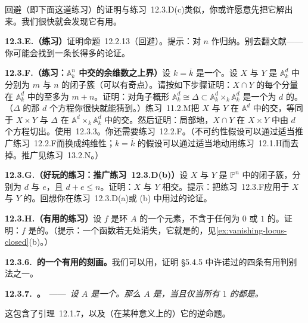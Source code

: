 \trPrimeIdeal{}回避（即下面这道练习）的证明与\mbox{练习~12.3.D(c)}类似，你或许愿意先把它解出来。我们很快就会发现它有用。

\textbf{12.3.E.（练习）}\quad 证明命题~12.2.13（\trPrimeIdeal{}回避）。提示：对 $n$ 作归纳。别去翻文献——你可能会找到一条长得多的论证。

\textbf{12.3.F.（练习：$\mathbb{A}^n_k$ 中交的余维数之上界）}\quad 设 $k=\overline{k}$ 是一个\trAlgClosedField。设 $X$ 与 $Y$ 是 $\mathbb{A}^d_k$ 中\trCodimension{}分别为 $m$ 与 $n$ 的\trIrreducible{}闭子簇（可以有奇点）。请按如下步骤证明：$X\cap Y$ 的每个分量在 $\mathbb{A}^d_k$ 中的\trCodimension{}至多为 $m+n$。证明：对角子概形 $\mathbb{A}^d_k\cong\Delta\subset\mathbb{A}^d_k\times_k\mathbb{A}^d_k$ 是一个\trCodimension{}为 $d$ 的\trRegularEmbedding。（$\Delta$ 的那 $d$ 个方程你很快就能猜到。）\mbox{练习~11.2.M}把 $X$ 与 $Y$ 在 $\mathbb{A}^d$ 中的交，等同于 $X\times Y$ 与 $\Delta$ 在 $\mathbb{A}^d\times_k\mathbb{A}^d_k$ 中的交。然后证明：局部地，$X\cap Y$ 在 $X\times Y$ 中由 $d$ 个方程切出。使用\trKrull{}\trPrincipalIdealTheorem~12.3.3。你还需要\mbox{练习~12.2.F}。（不可约性假设可以通过适当推广\mbox{练习~12.2.F}而换成纯维性；$k=\overline{k}$ 的假设可以通过适当地动用\mbox{练习~12.1.H}而去掉。推广见\mbox{练习~13.2.N}。）

\textbf{12.3.G.（好玩的练习：推广\mbox{练习~12.3.D(b)}）}\quad 设 $X$ 与 $Y$ 是 $\mathbb{P}^n$ 中\trPureDimensional{}的闭子簇，\trCodimension{}分别为 $d$ 与 $e$，且 $d+e\le n$。证明：$X$ 与 $Y$ 相交。提示：把\mbox{练习~12.3.F}应用于 $X$ 与 $Y$ 的\trAffine\trCone。回想你在\mbox{练习~12.3.D(a)}或 (b) 中用过的论证。

\textbf{12.3.H.（有用的练习）}\quad 设 $f$ 是\trNoetherian{}环 $A$ 的一个元素，不含于任何\trCodimension{}为 $0$ 或 $1$ 的\trPrimeIdeal。证明：$f$ 是\trInvertible{}的。（提示：一个函数若无处消失，它就是\trInvertible{}的，见\cref{ex:vanishing-locus-closed}(b)。）

\textbf{12.3.6.\ \trUFD{}的一个有用的刻画。}\quad 我们可以用\trKrull{}\trPrincipalIdealTheorem，证明 \S5.4.5 中许诺过的\trUFD{}四条有用判别法之一。

\textbf{12.3.7.\ \trhProposition{}。}\ ——\ \emph{设 $A$ 是一个\trNoetherian\trIntegralDomain。那么 $A$ 是\trUFD，当且仅当所有\trCodimension{} $1$ 的\trPrimeIdeal{}都是\trPrincipalIdeal。}

这包含了引理~12.1.7，以及（在某种意义上的）它的逆命题。

